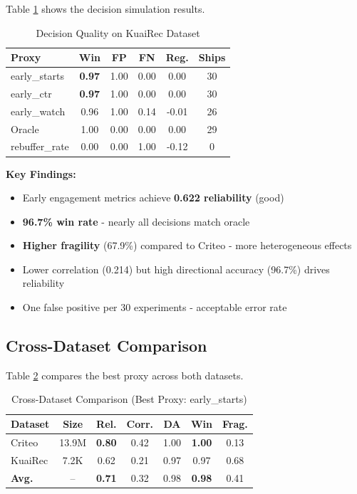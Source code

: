 \documentclass[11pt,twocolumn]{article}
\begin{document}
Table \ref{tab:kuairec_decisions} shows the decision simulation results.

\begin{table}[H]
\centering
\caption{Decision Quality on KuaiRec Dataset}
\label{tab:kuairec_decisions}
\small
\begin{tabular}{@{}lccccc@{}}
\toprule
\textbf{Proxy} & \textbf{Win} & \textbf{FP} & \textbf{FN} & \textbf{Reg.} & \textbf{Ships} \\
\midrule
early\_starts & \textbf{0.97} & 1.00 & 0.00 & 0.00 & 30 \\
early\_ctr & \textbf{0.97} & 1.00 & 0.00 & 0.00 & 30 \\
early\_watch & 0.96 & 1.00 & 0.14 & -0.01 & 26 \\
Oracle & 1.00 & 0.00 & 0.00 & 0.00 & 29 \\
rebuffer\_rate & 0.00 & 0.00 & 1.00 & -0.12 & 0 \\
\bottomrule
\end{tabular}
\end{table}

\textbf{Key Findings:}
\begin{itemize}
    \item Early engagement metrics achieve \textbf{0.622 reliability} (good)
    \item \textbf{96.7\% win rate} - nearly all decisions match oracle
    \item \textbf{Higher fragility} (67.9\%) compared to Criteo - more heterogeneous effects
    \item Lower correlation (0.214) but high directional accuracy (96.7\%) drives reliability
    \item One false positive per 30 experiments - acceptable error rate
\end{itemize}

\subsection{Cross-Dataset Comparison}

Table \ref{tab:comparison} compares the best proxy across both datasets.

\begin{table}[H]
\centering
\caption{Cross-Dataset Comparison (Best Proxy: early\_starts)}
\label{tab:comparison}
\small
\begin{tabular}{@{}lcccccc@{}}
\toprule
\textbf{Dataset} & \textbf{Size} & \textbf{Rel.} & \textbf{Corr.} & \textbf{DA} & \textbf{Win} & \textbf{Frag.} \\
\midrule
Criteo & 13.9M & \textbf{0.80} & 0.42 & 1.00 & \textbf{1.00} & 0.13 \\
KuaiRec & 7.2K & 0.62 & 0.21 & 0.97 & 0.97 & 0.68 \\
\midrule
\textbf{Avg.} & -- & \textbf{0.71} & 0.32 & 0.98 & \textbf{0.98} & 0.41 \\
\bottomrule
\end{tabular}
\end{table}
\end{document}
